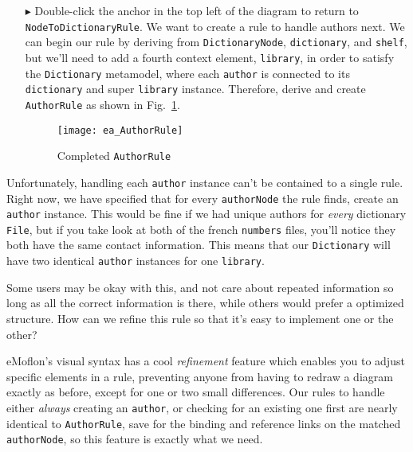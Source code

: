 \begin{itemize}
\item[$\blacktriangleright$] Double-click the anchor in the top left of the diagram to return to \texttt{NodeToDictionaryRule}. We want to create a rule to
handle authors next. We can begin our rule by deriving from \texttt{DictionaryNode}, \texttt{dictionary}, and \texttt{shelf}, but we'll need to add a fourth
context element, \texttt{library}, in order to satisfy the \texttt{Dictionary} metamodel, where each \texttt{author} is connected to its \texttt{dictionary} and
super \texttt{library} instance. Therefore, derive and create \texttt{AuthorRule} as shown in Fig.~\ref{ea:AuthorRule}.

\newpage

\begin{figure}[h]
  \hspace{-2cm}
  \texttt{[image: ea\_AuthorRule]}
  \caption{Completed \texttt{AuthorRule}}
  \label{ea:AuthorRule}
\end{figure}

\end{itemize}

Unfortunately, handling each \texttt{author} instance can't be contained to a single rule. Right now, we have specified that for every \texttt{authorNode} the
rule finds, create an \texttt{author} instance. This would be fine if we had unique authors for \emph{every} dictionary \texttt{File}, but if you take look at
both of the french \texttt{numbers} files, you'll notice they both have the same contact information. This means that our \texttt{Dictionary} will have two
identical \texttt{author} instances for one \texttt{library}.

Some users may be okay with this, and not care about repeated information so long as all the correct information is there, while others would prefer a
optimized structure. How can we refine this rule so that it's easy to implement one or the other?

eMoflon's visual syntax has a cool \emph{refinement} feature which enables you to adjust specific elements in a rule, preventing anyone from having to redraw a
diagram exactly as before, except for one or two small differences. Our rules to handle either \emph{always} creating an \texttt{author}, or checking for an
existing one first are nearly identical to \texttt{AuthorRule}, save for the binding and reference links on the matched \texttt{authorNode}, so this feature is
exactly what we need.

